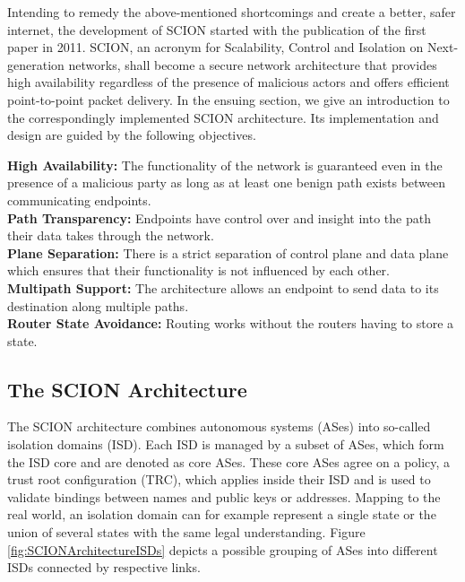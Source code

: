 Intending to remedy the above-mentioned shortcomings and create a better, safer internet, the development of SCION started with the publication of the first paper \cite{SCIONPaper} in 2011. SCION, an acronym for Scalability, Control and Isolation on Next-generation networks, shall become a secure network architecture that provides high availability regardless of the presence of malicious actors and offers efficient point-to-point packet delivery. In the ensuing section, we give an introduction to the correspondingly implemented SCION architecture. Its implementation and design are guided by the following objectives.

{\small \textbf{High Availability:} The functionality of the network is guaranteed even in the presence of a malicious party as long as at least one benign path exists between communicating endpoints. \smallskip\\
	\textbf{Path Transparency:} Endpoints have control over and insight into the path their data takes through the network. \smallskip\\
	\textbf{Plane Separation:} There is a strict separation of control plane and data plane which ensures that their functionality is not influenced by each other. \smallskip\\
	\textbf{Multipath Support:} The architecture allows an endpoint to send data to its destination along multiple paths. \smallskip\\
	\textbf{Router State Avoidance:} Routing works without the routers having to store a state.
}

\subsection*{The SCION Architecture}

The SCION architecture combines autonomous systems (ASes) into so-called isolation domains (ISD). Each ISD is managed by a subset of ASes, which form the ISD core and are denoted as core ASes. These core ASes agree on a policy, a trust root configuration (TRC), which applies inside their ISD and is used to validate bindings between names and public keys or addresses. Mapping to the real world, an isolation domain can for example represent a single state or the union of several states with the same legal understanding. Figure \ref{fig:SCIONArchitectureISDs} depicts a possible grouping of ASes into different ISDs connected by respective links.

